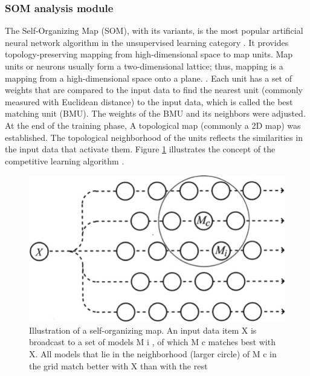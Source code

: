 \documentclass[preprint,3p,onecolumn]{elsarticle}
\begin{document}
\subsubsection{SOM analysis module}
\par The Self-Organizing Map (SOM), with its variants, is the most popular artificial neural network algorithm in the unsupervised learning category \citep {kohonen2012self}. It provides topology-preserving mapping from high-dimensional space to map units. Map units or neurons usually form a two-dimensional lattice; thus, mapping is a mapping from a high-dimensional space onto a plane. \citep {kohara2018clustering}. Each unit has a set of weights that are compared to the input data to find the nearest unit (commonly measured with Euclidean distance) to the input data, which is called the best matching unit (BMU). The weights of the BMU and its neighbors were adjusted. At the end of the training phase, A topological map (commonly a 2D map) was established. The topological neighborhood of the units reflects the similarities in the input data that activate them. Figure \ref{som} illustrates the concept of the competitive learning algorithm \citep {kohonen2013essentials}.

\begin{figure}[H]
\centering
\includegraphics[scale=1]{som}
\caption{Illustration of a self-organizing map. An input data item X is broadcast to a set of models M i , of which M c matches best with X. All models that lie in the neighborhood (larger circle) of M c in the grid match better with X than with the rest \citep{wandeto2017detection}}
\label{som}
\end{figure}
\end{document}
